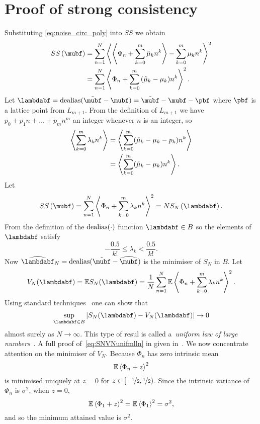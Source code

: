 \documentclass[journal]{IEEEtran}
\begin{document}
\section{Proof of strong consistency}\label{sec:strongconstproof}
 Substituting \eqref{eq:noise_circ_poly} into $SS$ we obtain
 \begin{align*}
SS\left( \mubf \right) &= \sum_{n=1}^{N}\fracpart{ \fracpart{ \Phi_n + \sum_{k = 0}^{m}{\tilde{\mu}_k n^k} } - \sum_{k = 0}^{m}{\mu_k n^k} }^{2} \\
&= \sum_{n=1}^{N}\fracpart{  \Phi_n + \sum_{k = 0}^{m}{(\tilde{\mu}_k - \mu_k) n^k} }^{2}.
\end{align*}
Let $\lambdabf = \dealias(\tilde{\mubf} - \mubf) = \tilde{\mubf} - \mubf - \pbf$ where $\pbf$ is a lattice point from $L_{m+1}$. From the definition of $L_{m+1}$ we have $p_0 + p_1 n + \dots + p_{m} n^m$ an integer whenever $n$ is an integer, so
\begin{align*}
\left\langle \sum_{k=0}^{m}\lambda_k n^k  \right\rangle &= \left\langle \sum_{k=0}^{m}(\tilde{\mu}_k - \mu_k - p_k) n^k  \right\rangle \\
&= \left\langle \sum_{k=0}^{m}(\tilde{\mu}_k - \mu_k) n^k  \right\rangle.
\end{align*}
Let
\[
SS\left( \mubf \right) = \sum_{n=1}^{N}\fracpart{  \Phi_n + \sum_{k = 0}^{m}{\lambda_k n^k} }  ^{2} = N S_{N}\left( \lambdabf \right).
 \]
From the definition of the $\operatorname{dealias}(\cdot)$ function $\lambdabf \in B$ so the elements of $\lambdabf$ satisfy
 \begin{equation} \label{eq:identifiability}
 -\frac{0.5}{k!} \leq \lambda_k < \frac{0.5}{k!}.
 \end{equation} 
Now $\widehat{\lambdabf}_N = \dealias(\tilde{\mubf} - \widehat{\mubf})$ is the minimiser of $S_{N}$ in $B$.  %
Let
\[
V_N(\lambdabf) =  \expect S_N(\lambdabf) = \frac{1}{N}\sum_{n=1}^{N} \expect \fracpart{  \Phi_{n}+\sum_{k = 0}^{m}{\lambda_k n^k}}  ^{2}.
\]
Using standard techniques~\cite{Pollard_conv_stat_proc_1984,van2009empirical} one can show that
 \begin{equation}\label{eq:SNVNunifmlln}
\sup_{\lambdabf \in B}\sabs{S_N(\lambdabf) - V_N(\lambdabf)} \rightarrow 0  
 \end{equation}
almost surely as $N\rightarrow\infty$.  This type of resul is called a~\emph{uniform law of large numbers}~\cite{Pollard_conv_stat_proc_1984,van2009empirical}.  A full proof of~\eqref{eq:SNVNunifmlln} in given in~\cite{McKilliam_mean_dir_est_sq_arc_length2010}.  We now concentrate attention on the minimiser of $V_N$. Because $\Phi_n$ has zero intrinsic mean 
\begin{equation}\label{eq:Efracpartmined}
{\mathbb E} \left\langle  \Phi_n + z  \right\rangle^{2}
\end{equation}
is minimised uniquely at $z = 0$ for $z \in [-\nicefrac{1}{2}, \nicefrac{1}{2})$.  Since the intrinsic variance of $\Phi_n$ is $\sigma^2$, when $z = 0$,
\begin{equation}\label{eq:Efracpartphi}
{\mathbb E}\left\langle \Phi_1+z \right\rangle^{2} = {\mathbb E}\left\langle \Phi_1 \right\rangle^{2} = \sigma^2,
\end{equation}
and so the minimum attained value is $\sigma^2$.
\end{document}
